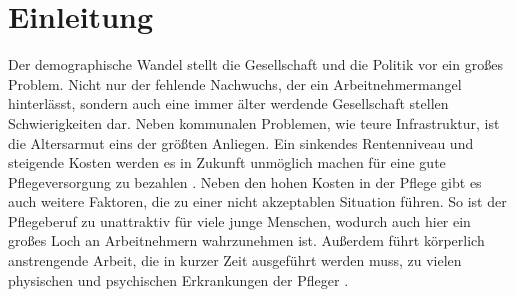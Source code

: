 \section{Einleitung}
\label{sec:einleitung}

Der demographische Wandel stellt die Gesellschaft und die Politik vor ein großes Problem. Nicht nur der fehlende Nachwuchs, der ein Arbeitnehmermangel hinterlässt, sondern auch eine immer älter werdende Gesellschaft stellen Schwierigkeiten dar. Neben kommunalen Problemen, wie teure Infrastruktur, ist die Altersarmut eins der größten Anliegen. Ein sinkendes Rentenniveau und steigende Kosten werden es in Zukunft unmöglich machen für eine gute Pflegeversorgung zu bezahlen  \citep{brunozandonella2013}. Neben den hohen Kosten in der Pflege gibt es auch weitere Faktoren, die zu einer nicht akzeptablen Situation führen. So ist der Pflegeberuf zu unattraktiv für viele junge Menschen, wodurch auch hier ein großes Loch an Arbeitnehmern wahrzunehmen ist. Außerdem führt körperlich anstrengende Arbeit, die in kurzer Zeit ausgeführt werden muss, zu vielen physischen und psychischen Erkrankungen der Pfleger \citep{AOK2004}.

